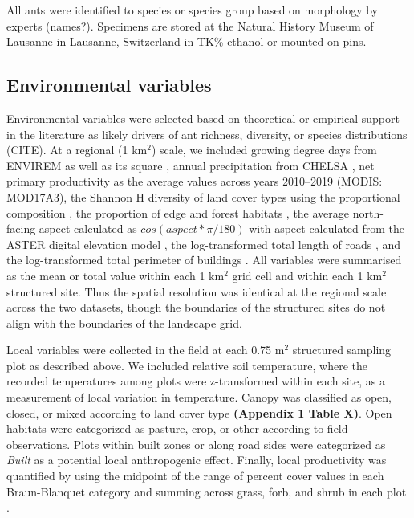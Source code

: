 \documentclass[preprint,review,times,12pt]{elsarticle}
\begin{document}
All ants were identified to species or species group based on morphology by experts (names?). Specimens are stored at the Natural History Museum of Lausanne in Lausanne, Switzerland in TK\% ethanol or mounted on pins. 


\subsection{Environmental variables}
Environmental variables were selected based on theoretical or empirical support in the literature as likely drivers of ant richness, diversity, or species distributions (CITE). At a regional (1 km$^2$) scale, we included growing degree days from ENVIREM as well as its square \citep{Title2018}, annual precipitation from CHELSA \citep{Karger2017}, net primary productivity as the average values across years 2010–2019 (MODIS: MOD17A3), the Shannon H diversity of land cover types using the proportional composition \citep{Gago-Silva2017}, the proportion of edge and forest habitats \citep{Gago-Silva2017}, the average north-facing aspect calculated as $cos(aspect*\pi/180)$ with aspect calculated from the ASTER digital elevation model \citep{Tachikawa2011}, the log-transformed total length of roads \citep{OpenStreetMap}, and the log-transformed total perimeter of buildings \citep{OpenStreetMap}. All variables were summarised as the mean or total value within each 1 km$^2$ grid cell and within each 1 km$^2$ structured site. Thus the spatial resolution was identical at the regional scale across the two datasets, though the boundaries of the structured sites do not align with the boundaries of the landscape grid.

Local variables were collected in the field at each 0.75 m$^2$ structured sampling plot as described above. We included relative soil temperature, where the recorded temperatures among plots were z-transformed within each site, as a measurement of local variation in temperature. Canopy was classified as open, closed, or mixed according to land cover type \textbf{(Appendix 1 Table X)}. Open habitats were categorized as pasture, crop, or other according to field observations. Plots within built zones or along road sides were categorized as \emph{Built} as a potential local anthropogenic effect. Finally, local productivity was quantified by using the midpoint of the range of percent cover values in each Braun-Blanquet category and summing across grass, forb, and shrub in each plot \citep{Douglas1978,Mccain2018,Szewczyk2018}.
\end{document}
